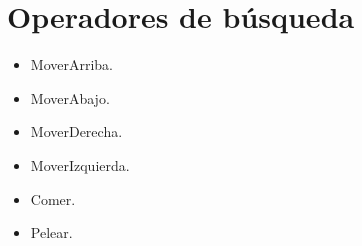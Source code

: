 \section{Operadores de búsqueda}


\begin{itemize}
\item MoverArriba.
\item MoverAbajo.
\item MoverDerecha.
\item MoverIzquierda.
\item Comer.
\item Pelear.
\end{itemize}
